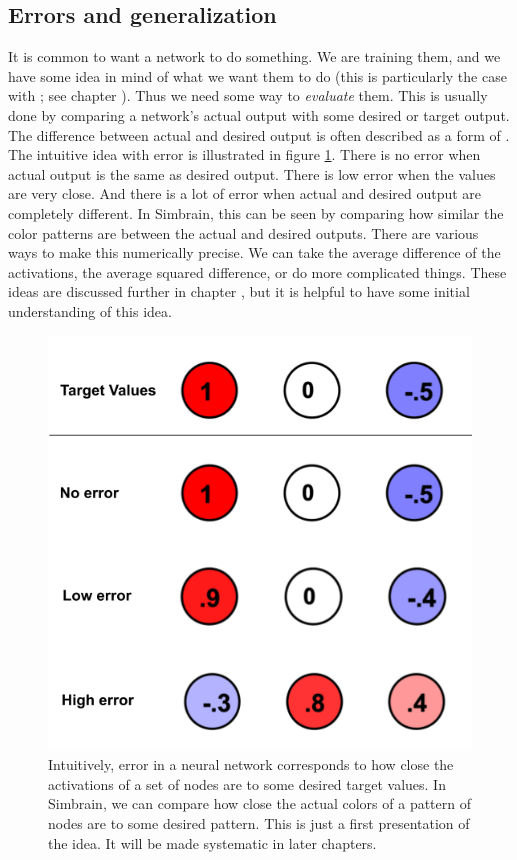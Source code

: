 \subsection{Errors and generalization}\label{evaluatingNN}

It is common to want a network to do something. We are training them, and we have some idea in mind of what we want them to do (this is particularly the case with ; see chapter ). Thus we need some way to \emph{evaluate} them. This is usually done by comparing a network's actual output with some desired or target output. The difference between actual and desired output is often described as a form of . The intuitive idea with error is illustrated in figure \ref{intuitiveError}. There is no error when actual output is the same as desired output. There is low error when the values are very close. And there is a lot of error when actual and desired output are completely different. In Simbrain, this can be seen by comparing how similar the color patterns are between the actual and desired outputs. There are various ways to make this numerically precise. We can take the average difference of the activations, the average squared difference, or do more complicated things. These ideas are discussed further in chapter , but it is helpful to have some initial understanding of this idea. 

\begin{figure}[h]
\centering
\includegraphics[scale=.3]{./images/ErrorIntuitive}
\caption[Jeff Yoshimi.]{Intuitively, error in a neural network corresponds to how close the activations of a set of nodes are to some desired target values. In Simbrain, we can compare how close the actual colors of a pattern of nodes are to some desired pattern. This is just a first presentation of the idea. It will be made systematic in later chapters.}
\label{intuitiveError}
\end{figure}

